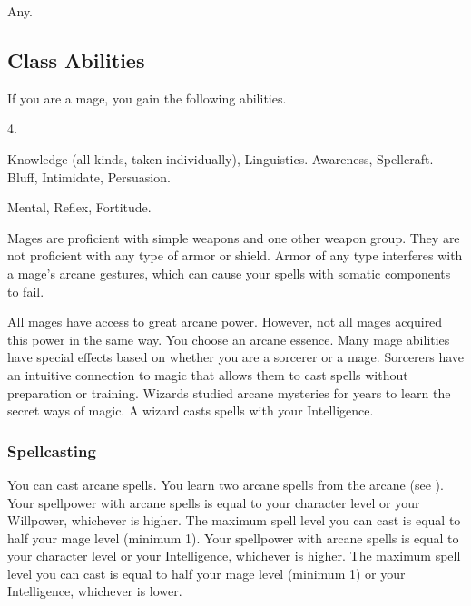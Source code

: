      Any.

    \subsection{Class Abilities}
        If you are a mage, you gain the following abilities.

         4.

         Knowledge (all kinds, taken individually), Linguistics.
         Awareness, Spellcraft.
         Bluff, Intimidate, Persuasion.

          Mental,  Reflex,  Fortitude.

        Mages are proficient with simple weapons and one other weapon group.
        They are not proficient with any type of armor or shield.
        Armor of any type interferes with a mage's arcane gestures, which can cause your spells with somatic components to fail.

        All mages have access to great arcane power.
        However, not all mages acquired this power in the same way.
        You choose an arcane essence.
        Many mage abilities have special effects based on whether you are a sorcerer or a mage.
         Sorcerers have an intuitive connection to magic that allows them to cast spells without preparation or training.
         Wizards studied arcane mysteries for years to learn the secret ways of magic.
        A wizard casts spells with your Intelligence.

        \subsubsection{Spellcasting}

            You can cast arcane spells.
            You learn two arcane spells from the arcane  (see ).
             Your spellpower with arcane spells is equal to your character level or your Willpower, whichever is higher.
            The maximum spell level you can cast is equal to half your mage level (minimum 1).
             Your spellpower with arcane spells is equal to your character level or your Intelligence, whichever is higher.
            The maximum spell level you can cast is equal to half your mage level (minimum 1) or your Intelligence, whichever is lower.

